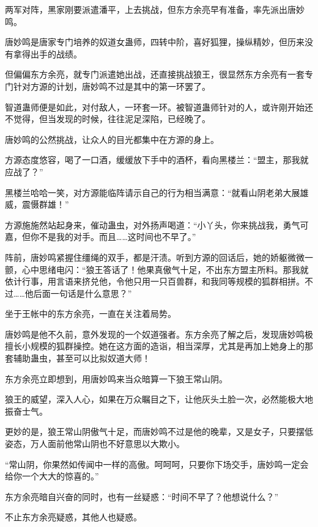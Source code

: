 
\begin{this_body}



两军对阵，黑家刚要派遣潘平，上去挑战，但东方余亮早有准备，率先派出唐妙鸣。

唐妙鸣是唐家专门培养的奴道女蛊师，四转中阶，喜好狐狸，操纵精妙，但历来没有拿得出手的战绩。

但偏偏东方余亮，就专门派遣她出战，还直接挑战狼王，很显然东方余亮有一套专门针对方源的计划，唐妙鸣不过是其中的第一环罢了。

智道蛊师便是如此，对付敌人，一环套一环。被智道蛊师针对的人，或许刚开始还不觉得，但当发现的时候，往往泥足深陷，已经晚了。

唐妙鸣的公然挑战，让众人的目光都集中在方源的身上。

方源态度悠容，喝了一口酒，缓缓放下手中的酒杯，看向黑楼兰：“盟主，那我就应战了？”

黑楼兰哈哈一笑，对方源能临阵请示自己的行为相当满意：“就看山阴老弟大展雄威，震慑群雄！”

方源施施然站起身来，催动蛊虫，对外扬声喝道：“小丫头，你来挑战我，勇气可嘉，但你不是我的对手。而且……这时间也不早了。”

阵前，唐妙鸣紧握住缰绳的双手，都是汗渍。听到方源的回话后，她的娇躯微微一颤，心中思绪电闪：“狼王答话了！他果真傲气十足，不出东方盟主所料。那我就依计行事，用言语来挤兑他，令他只用一只百兽群，和我同等规模的狐群相拼。不过……他后面一句话是什么意思？”

坐于王帐中的东方余亮，一直在关注着局势。

唐妙鸣是他不久前，意外发现的一个奴道强者。东方余亮了解之后，发现唐妙鸣极擅长小规模的狐群操控。她在这方面的造诣，相当深厚，尤其是再加上她身上的那套辅助蛊虫，甚至可以比拟奴道大师！

东方余亮立即想到，用唐妙鸣来当众暗算一下狼王常山阴。

狼王的威望，深入人心，如果在万众瞩目之下，让他灰头土脸一次，必然能极大地振奋士气。

更妙的是，狼王常山阴傲气十足，而唐妙鸣不过是他的晚辈，又是女子，只要摆低姿态，万人面前他常山阴也不好意思以大欺小。

“常山阴，你果然如传闻中一样的高傲。呵呵呵，只要你下场交手，唐妙鸣一定会给你一个大大的惊喜的。”

东方余亮暗自兴奋的同时，也有一丝疑惑：“时间不早了？他想说什么？”

不止东方余亮疑惑，其他人也疑惑。


\end{this_body}
